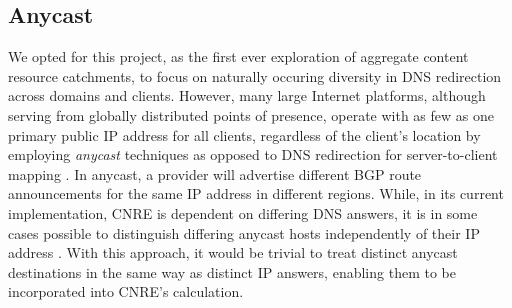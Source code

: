 \subsection{Anycast}
\label{anycast}

We opted for this project, as the first ever exploration of aggregate content
resource catchments, to focus on naturally occuring diversity in DNS redirection
across domains and clients. However, many large Internet platforms, although
serving from globally distributed points of presence, operate with as few as one
primary public IP address for all clients, regardless of the client's location
by employing \emph{anycast} techniques as opposed to DNS redirection for
server-to-client mapping \cite{Katabi:2000:FSG:347059.347388}. In anycast, a provider will advertise
different BGP route announcements for the same IP address in different regions.
While, in its current implementation, CNRE is dependent on differing DNS
answers, it is in some cases possible to distinguish differing anycast hosts
independently of their IP address \cite{anycast,fan2013evaluating,boothe2005dns}. With this approach, it would be trivial
to treat distinct anycast destinations in the same way as distinct IP answers,
enabling them to be incorporated into CNRE's calculation.
